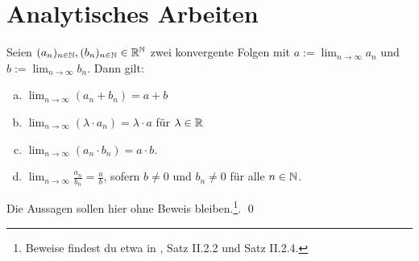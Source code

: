 \section{Analytisches Arbeiten}


\begin{satz} \label{konvergenzregeln}
    Seien $(a_n)_{n\in \mathbb N},(b_n)_{n\in \mathbb N}\in \mathbb R^\mathbb N$ zwei konvergente Folgen mit $a:=\lim_{n\to\infty}a_n$ und $b:=\lim_{n\to\infty}b_n$. Dann gilt:
    \begin{enumerate}[a)]
        \item $\lim_{n\to\infty}(a_n+b_n)=a+b$
        \item $\lim_{n\to\infty}(\lambda \cdot a_n)=\lambda \cdot a$ für $\lambda\in\mathbb R$
        \item $\lim_{n\to\infty}(a_n\cdot b_n)=a\cdot b$.
        \item $\lim_{n\to\infty}\frac{a_n}{b_n} = \frac{a}{b}$, sofern $b\neq 0$ und $b_n\neq 0$ für alle $n\in \mathbb N$.
    \end{enumerate}
\end{satz}


\begin{bew}
    Die Aussagen sollen hier ohne Beweis bleiben.\footnote{Beweise findest du etwa in \cite{AE06}, Satz II.2.2 und Satz II.2.4.}. \qed
\end{bew}


